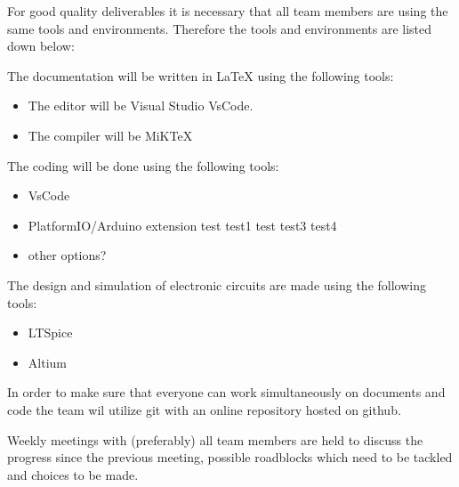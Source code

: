 For good quality deliverables it is necessary that all team members are using the same tools and environments. Therefore the tools and environments are listed down below:

The documentation will be written in LaTeX using the following tools:
\begin{itemize}
    \setlength\itemsep{-0.3em}
    \item The editor will be Visual Studio VsCode.
    \item The compiler will be MiKTeX
\end{itemize}

The coding will be done using the following tools:
\begin{itemize}
    \item VsCode
    \item PlatformIO/Arduino extension
    \subitem test
    \subsubitem test1
    \subsubitem test
    \subitem test3
    \subsubitem test4
    \item other options?
\end{itemize}

The design and simulation of electronic circuits are made using the following tools:
\begin{itemize}
    \item LTSpice
    \item Altium
\end{itemize}

In order to make sure that everyone can work simultaneously on documents and code the team wil utilize git with an online repository hosted on github.

Weekly meetings with (preferably) all team members are held to discuss the progress since the previous meeting, possible roadblocks which need to be tackled and choices to be made.